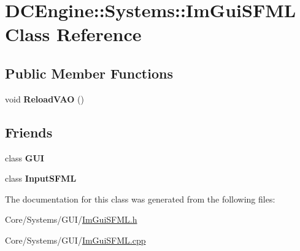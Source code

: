\hypertarget{classDCEngine_1_1Systems_1_1ImGuiSFML}{\section{D\-C\-Engine\-:\-:Systems\-:\-:Im\-Gui\-S\-F\-M\-L Class Reference}
\label{classDCEngine_1_1Systems_1_1ImGuiSFML}
}
\subsection*{Public Member Functions}
\begin{DoxyCompactItemize}
\item 
\hypertarget{classDCEngine_1_1Systems_1_1ImGuiSFML_a95c6cab702f6a768a71dcbf437fb75ee}{void {\bfseries Reload\-V\-A\-O} ()}\label{classDCEngine_1_1Systems_1_1ImGuiSFML_a95c6cab702f6a768a71dcbf437fb75ee}

\end{DoxyCompactItemize}
\subsection*{Friends}
\begin{DoxyCompactItemize}
\item 
\hypertarget{classDCEngine_1_1Systems_1_1ImGuiSFML_ac5a3536de371167fdf200e8943f8c2b0}{class {\bfseries G\-U\-I}}\label{classDCEngine_1_1Systems_1_1ImGuiSFML_ac5a3536de371167fdf200e8943f8c2b0}

\item 
\hypertarget{classDCEngine_1_1Systems_1_1ImGuiSFML_a75463b7fc04ee0ed91ae84990048dce6}{class {\bfseries Input\-S\-F\-M\-L}}\label{classDCEngine_1_1Systems_1_1ImGuiSFML_a75463b7fc04ee0ed91ae84990048dce6}

\end{DoxyCompactItemize}


The documentation for this class was generated from the following files\-:\begin{DoxyCompactItemize}
\item 
Core/\-Systems/\-G\-U\-I/\hyperlink{ImGuiSFML_8h}{Im\-Gui\-S\-F\-M\-L.\-h}\item 
Core/\-Systems/\-G\-U\-I/\hyperlink{ImGuiSFML_8cpp}{Im\-Gui\-S\-F\-M\-L.\-cpp}\end{DoxyCompactItemize}
